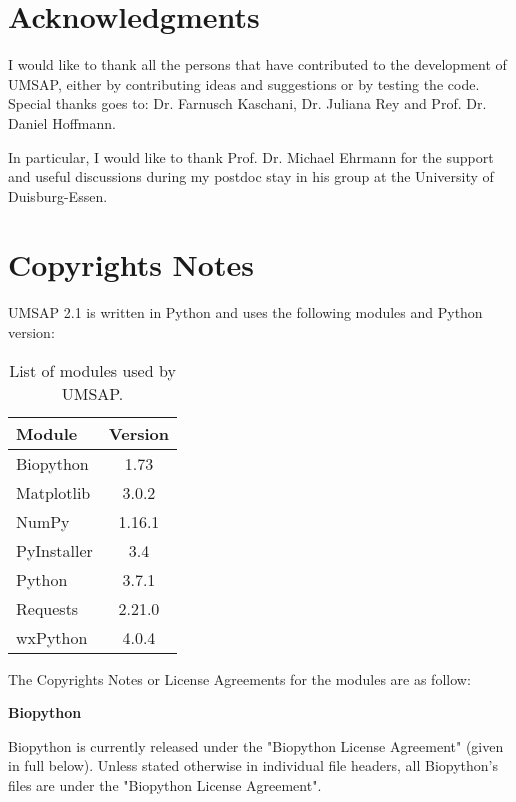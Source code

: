 \newpage

\section{Acknowledgments}

I would like to thank all the persons that have contributed to the development of UMSAP, either by contributing ideas and suggestions or by testing the code. Special thanks goes to: Dr. Farnusch Kaschani, Dr. Juliana Rey and Prof. Dr. Daniel Hoffmann.

In particular, I would like to thank Prof. Dr. Michael Ehrmann for the support and useful discussions during my postdoc stay in his group at the University of Duisburg-Essen. 

\section{Copyrights Notes}

UMSAP \num{2.1} is written in Python and uses the following modules and Python version:
\begin{table}[h!]
	\centering
	\begin{tabular}{l c}
		\hline
		Module & Version \\
		\hline
        Biopython & \num{1.73} \\
        Matplotlib  &  \num[parse-numbers=false]{3.0.2} \\
        NumPy      &  \num[parse-numbers=false]{1.16.1}\\
        PyInstaller &  \num{3.4}\\
        Python      &  \num[parse-numbers=false]{3.7.1}\\
        Requests   &  \num[parse-numbers=false]{2.21.0}\\
        wxPython  &  \num[parse-numbers=false]{4.0.4}\\
        \hline		
	\end{tabular}
	\caption[List of modules used by UMSAP]{List of modules used by UMSAP.}
	\label{table:umsappythonmodules}
\end{table}

The Copyrights Notes or License Agreements for the modules are as follow:

\textbf{Biopython}

Biopython is currently released under the "Biopython License Agreement" (given in full below). Unless stated otherwise in individual file headers, all Biopython's files are under the "Biopython License Agreement".

